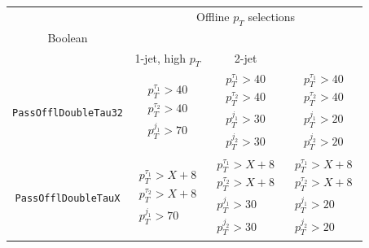\documentclass[../main.tex]{subfiles}
\begin{document}
\begin{table}
	\begin{center}
	\begin{tabular}{c || c | c | c }
		                           & \multicolumn{3}{c}{Offline $p_T$ selections} \\
		                           \cline{2-4}\noalign{\vskip\doublerulesep
         \vskip-\arrayrulewidth}
         						   \cline{2-4}
		  Boolean         & \multicolumn{2}{c|}{\htt} &   \multirow{2}{*}{\hhbbtt}      \\\cline{2-3}               
		                  & 1-jet, high $p_T$ & 2-jet &  \\\hline\hline
		\texttt{PassOfflDoubleTau32} & 
			$\begin{matrix}
				p_T^{\tau_1}>40\\
				p_T^{\tau_2}>40\\
				p_T^{j_1}>70
			\end{matrix}$ &
			$\begin{matrix}
				p_T^{\tau_1}>40\\
				p_T^{\tau_2}>40\\
				p_T^{j_1}>30 \\
				p_T^{j_2}>30
			\end{matrix}$ &
			$\begin{matrix}
				p_T^{\tau_1}>40\\
				p_T^{\tau_2}>40\\
				p_T^{j_1}>20\\
				p_T^{j_2}>20
			\end{matrix}$ \\\hline
		\texttt{PassOfflDoubleTauX} & 
			$\begin{matrix}
				p_T^{\tau_1}>X+8\\
				p_T^{\tau_2}>X+8\\
				p_T^{j_1}>70
			\end{matrix}$ &
			$\begin{matrix}
				p_T^{\tau_1}>X+8\\
				p_T^{\tau_2}>X+8\\
				p_T^{j_1}>30 \\
				p_T^{j_2}>30
			\end{matrix}$ &
			$\begin{matrix}
				p_T^{\tau_1}>X+8\\
				p_T^{\tau_2}>X+8\\
				p_T^{j_1}>20\\
				p_T^{j_2}>20
			\end{matrix}$ \\\hline

\end{tabular}
\end{center}
\end{table}
\end{document}
